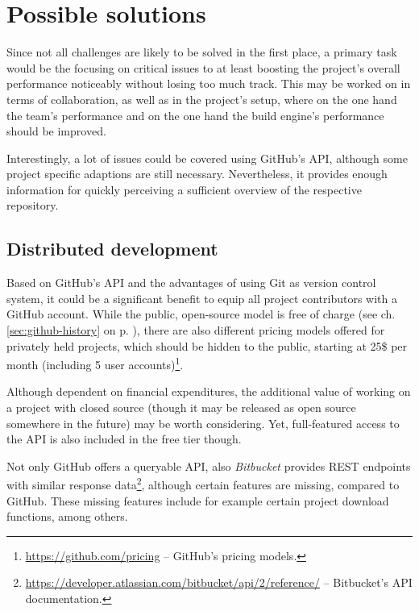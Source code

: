 \section{Possible solutions}
\label{sec:possible-solutions}

Since not all challenges are likely to be solved in the first place, a primary task would be the focusing on critical issues to at least boosting the project's overall performance noticeably without losing too much track. This may be worked on in terms of collaboration, as well as in the project's setup, where on the one hand the team's performance and on the one hand the build engine's performance should be improved.

Interestingly, a lot of issues could be covered using GitHub's API, although some project specific adaptions are still necessary. Nevertheless, it provides enough information for quickly perceiving a sufficient overview of the respective repository.


\subsection{Distributed development}
\label{sec:solutions-distributeddevelopment}

Based on GitHub's API and the advantages of using Git as version control system, it could be a significant benefit to equip all project contributors with a GitHub account. While the public, open-source model is free of charge (see ch. \ref{sec:github-history} on p. \pageref{sec:github-history}), there are also different pricing models offered for privately held projects, which should be hidden to the public, starting at 25\$ per month (including 5 user accounts)\footnote{\url{https://github.com/pricing} -- GitHub's pricing models.}.

Although dependent on financial expenditures, the additional value of working on a project with closed source (though it may be released as open source somewhere in the future) may be worth considering. Yet, full-featured access to the API is also included in the free tier though.

Not only GitHub offers a queryable API, also \emph{Bitbucket} provides REST endpoints with similar response data\footnote{\url{https://developer.atlassian.com/bitbucket/api/2/reference/} -- Bitbucket's API documentation.}, although certain features are missing, compared to GitHub. These missing features include for example certain project download functions, among others.


